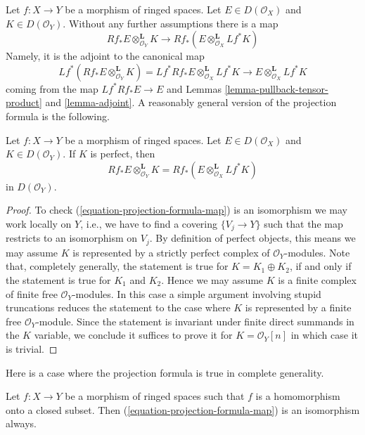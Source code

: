 \noindent
Let $f : X \to Y$ be a morphism of ringed spaces. 
Let $E \in D(\mathcal{O}_X)$ and $K \in D(\mathcal{O}_Y)$.
Without any further assumptions there is a map
\begin{equation}
\label{equation-projection-formula-map}
Rf_*E \otimes^\mathbf{L}_{\mathcal{O}_Y} K
\longrightarrow
Rf_*(E \otimes^\mathbf{L}_{\mathcal{O}_X} Lf^*K)
\end{equation}
Namely, it is the adjoint to the canonical map
$$
Lf^*(Rf_*E \otimes^\mathbf{L}_{\mathcal{O}_Y} K) =
Lf^*Rf_*E \otimes^\mathbf{L}_{\mathcal{O}_X} Lf^*K
\longrightarrow
E \otimes^\mathbf{L}_{\mathcal{O}_X} Lf^*K
$$
coming from the map $Lf^*Rf_*E \to E$ and Lemmas
\ref{lemma-pullback-tensor-product} and \ref{lemma-adjoint}.
A reasonably general version of the projection formula is the following.

\begin{lemma}
\label{lemma-projection-formula-perfect}
Let $f : X \to Y$ be a morphism of ringed spaces.
Let $E \in D(\mathcal{O}_X)$ and $K \in D(\mathcal{O}_Y)$.
If $K$ is perfect, then
$$
Rf_*E \otimes^\mathbf{L}_{\mathcal{O}_Y} K =
Rf_*(E \otimes^\mathbf{L}_{\mathcal{O}_X} Lf^*K)
$$
in $D(\mathcal{O}_Y)$.
\end{lemma}

\begin{proof}
To check (\ref{equation-projection-formula-map}) is an isomorphism
we may work locally on $Y$, i.e., we have to find a covering $\{V_j \to Y\}$
such that the map restricts to an isomorphism on $V_j$. By definition
of perfect objects, this means we may assume $K$ is represented by
a strictly perfect complex of $\mathcal{O}_Y$-modules.
Note that, completely generally, the statement is true for
$K = K_1 \oplus K_2$, if and only if the statement is true for
$K_1$ and $K_2$. Hence we may assume $K$ is a finite
complex of finite free $\mathcal{O}_Y$-modules.
In this case a simple argument involving stupid truncations reduces
the statement to the case where $K$ is represented by a finite
free $\mathcal{O}_Y$-module. Since the statement is invariant
under finite direct summands in the $K$ variable, we conclude
it suffices to prove it for $K = \mathcal{O}_Y[n]$
in which case it is trivial.
\end{proof}

\noindent
Here is a case where the projection formula is true in complete
generality.

\begin{lemma}
\label{lemma-projection-formula-closed-immersion}
Let $f : X \to Y$ be a morphism of ringed spaces such that $f$ is a
homomorphism onto a closed subset. Then
(\ref{equation-projection-formula-map}) is an isomorphism always.
\end{lemma}

